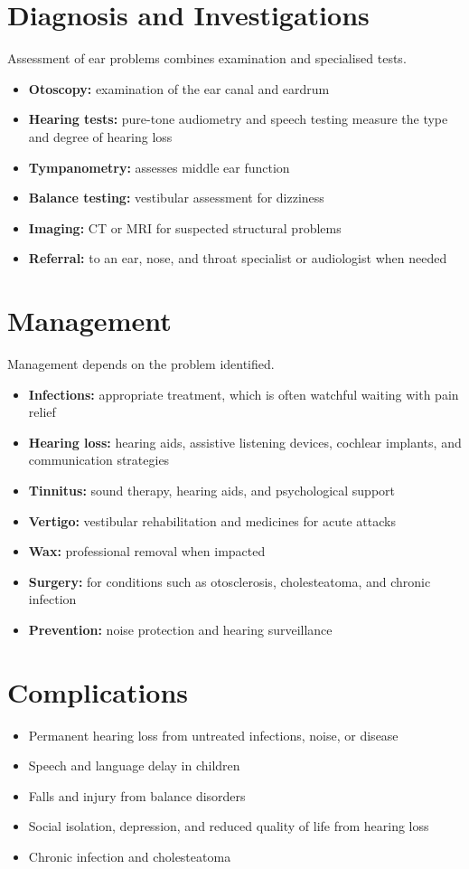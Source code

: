 \section*{Diagnosis and Investigations}
Assessment of ear problems combines examination and specialised tests.
\begin{itemize}
    \item \textbf{Otoscopy:} examination of the ear canal and eardrum
    \item \textbf{Hearing tests:} pure-tone audiometry and speech testing measure the type and degree of hearing loss
    \item \textbf{Tympanometry:} assesses middle ear function
    \item \textbf{Balance testing:} vestibular assessment for dizziness
    \item \textbf{Imaging:} CT or MRI for suspected structural problems
    \item \textbf{Referral:} to an ear, nose, and throat specialist or audiologist when needed
\end{itemize}

\section*{Management}
Management depends on the problem identified.
\begin{itemize}
    \item \textbf{Infections:} appropriate treatment, which is often watchful waiting with pain relief
    \item \textbf{Hearing loss:} hearing aids, assistive listening devices, cochlear implants, and communication strategies
    \item \textbf{Tinnitus:} sound therapy, hearing aids, and psychological support
    \item \textbf{Vertigo:} vestibular rehabilitation and medicines for acute attacks
    \item \textbf{Wax:} professional removal when impacted
    \item \textbf{Surgery:} for conditions such as otosclerosis, cholesteatoma, and chronic infection
    \item \textbf{Prevention:} noise protection and hearing surveillance
\end{itemize}

\section*{Complications}
\begin{itemize}
    \item Permanent hearing loss from untreated infections, noise, or disease
    \item Speech and language delay in children
    \item Falls and injury from balance disorders
    \item Social isolation, depression, and reduced quality of life from hearing loss
    \item Chronic infection and cholesteatoma
\end{itemize}

